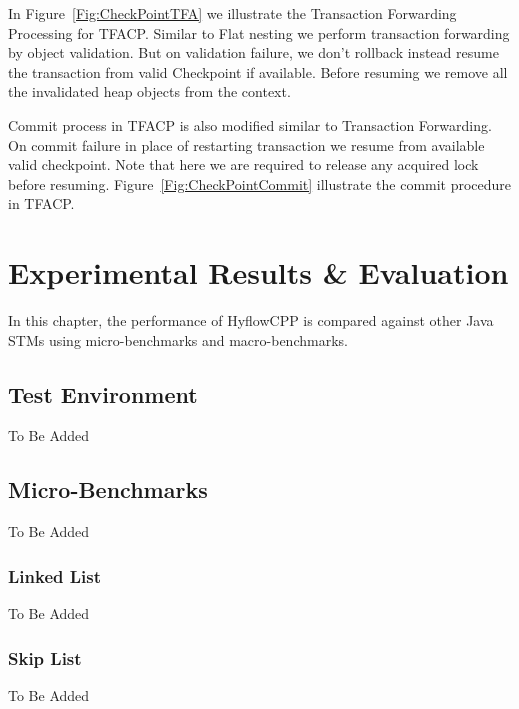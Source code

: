 \documentclass[12pt,english]{report}
\begin{document}
In Figure~\ref{Fig:CheckPointTFA} we illustrate the Transaction Forwarding Processing for TFACP. Similar to Flat nesting we perform transaction forwarding by object validation. But on validation failure, we don't rollback instead resume the transaction from valid Checkpoint if available. Before resuming we remove all the invalidated heap objects from the context.

Commit process in TFACP is also modified similar to Transaction Forwarding. On commit failure in place of restarting transaction we resume from available valid checkpoint. Note that here we are required to release any acquired lock before resuming. Figure~\ref{Fig:CheckPointCommit} illustrate the commit procedure in TFACP. 

\chapter{Experimental Results \& Evaluation}\label{chap:expResults}

In this chapter, the performance of HyflowCPP is compared against other Java STMs using micro-benchmarks and macro-benchmarks.

\section{Test Environment}

To Be Added

\section{Micro-Benchmarks}

To Be Added 

\subsection{Linked List\label{sub:Linked-List}}

To Be Added 

\subsection{Skip List}

To Be Added 
\end{document}
